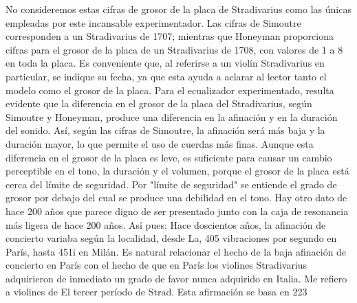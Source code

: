 No consideremos estas cifras de grosor de la placa de Stradivarius como las únicas empleadas por este incansable experimentador. Las cifras de Simoutre corresponden a un Stradivarius de 1707; mientras que Honeyman proporciona cifras para el grosor de la placa de un Stradivarius de 1708, con valores de 1 a 8 en toda la placa. Es conveniente que, al referirse a un violín Stradivarius en particular, se indique su fecha, ya que esta ayuda a aclarar al lector tanto el modelo como el grosor de la placa. Para el ecualizador experimentado, resulta evidente que la diferencia en el grosor de la placa del Stradivarius, según Simoutre y Honeyman, produce una diferencia en la afinación y en la duración del sonido. Así, según las cifras de Simoutre, la afinación será más baja y la duración mayor, lo que permite el uso de cuerdas más finas. Aunque esta diferencia en el grosor de la placa es leve, es suficiente para causar un cambio perceptible en el tono, la duración y el volumen, porque el grosor de la placa está cerca del límite de seguridad. Por "límite de seguridad" se entiende el grado de grosor por debajo del cual se produce una debilidad en el tono. Hay otro dato de hace 200 años que parece digno de ser presentado junto con la caja de resonancia más ligera de hace 200 años. Así pues: Hace doscientos años, la afinación de concierto variaba según la localidad, desde La, 405 vibraciones por segundo en París, hasta 451i en Milán. Es natural relacionar el hecho de la baja afinación de concierto en París con el hecho de que en París los violines Stradivarius adquirieron de inmediato un grado de favor nunca adquirido en Italia. Me refiero a violines de
El tercer período de Strad.	Esta afirmación se basa en 223


